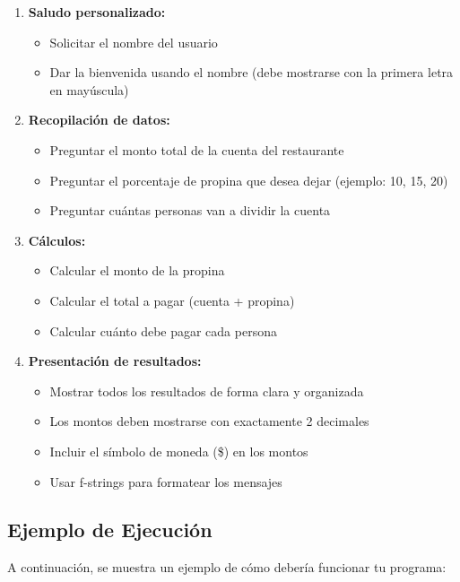\documentclass[12pt,a4paper]{article}
\begin{document}
\begin{enumerate}[leftmargin=*]
    \item \textbf{Saludo personalizado:}
    \begin{itemize}
        \item Solicitar el nombre del usuario
        \item Dar la bienvenida usando el nombre (debe mostrarse con la primera letra en mayúscula)
    \end{itemize}
    
    \item \textbf{Recopilación de datos:}
    \begin{itemize}
        \item Preguntar el monto total de la cuenta del restaurante
        \item Preguntar el porcentaje de propina que desea dejar (ejemplo: 10, 15, 20)
        \item Preguntar cuántas personas van a dividir la cuenta
    \end{itemize}
    
    \item \textbf{Cálculos:}
    \begin{itemize}
        \item Calcular el monto de la propina
        \item Calcular el total a pagar (cuenta + propina)
        \item Calcular cuánto debe pagar cada persona
    \end{itemize}
    
    \item \textbf{Presentación de resultados:}
    \begin{itemize}
        \item Mostrar todos los resultados de forma clara y organizada
        \item Los montos deben mostrarse con exactamente 2 decimales
        \item Incluir el símbolo de moneda (\$) en los montos
        \item Usar f-strings para formatear los mensajes
    \end{itemize}
\end{enumerate}

\subsection{Ejemplo de Ejecución}

A continuación, se muestra un ejemplo de cómo debería funcionar tu programa:
\end{document}
